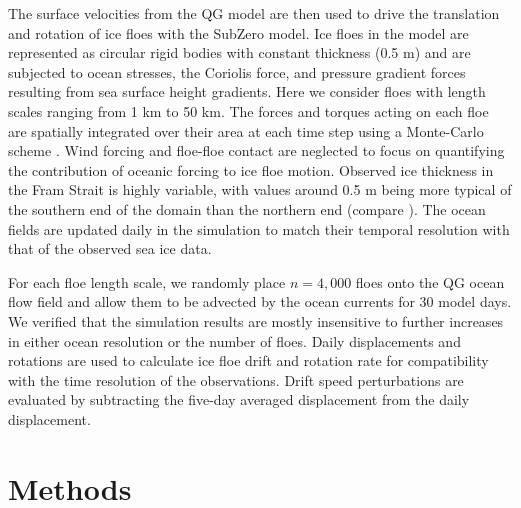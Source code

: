 \documentclass[aog]{igs}
\begin{document}
The surface velocities from the QG model are then used to drive the translation and rotation of ice floes with the SubZero model. Ice floes in the model are represented as circular rigid bodies with constant thickness (0.5 m) and are subjected to ocean stresses, the Coriolis force, and pressure gradient forces resulting from sea surface height gradients. Here we consider floes with length scales ranging from 1 km to 50 km. The forces and torques acting on each floe are spatially integrated over their area at each time step using a Monte-Carlo scheme \citep{Caflisch1998_monte}. Wind forcing and floe-floe contact are neglected to focus on quantifying the contribution of oceanic forcing to ice floe motion. Observed ice thickness in the Fram Strait is highly variable, with values around 0.5 m being more typical of the southern end of the domain than the northern end (compare \cite{spreen2020_ArcticSea, brunette2022_NewStatedependent}).
The ocean fields are updated daily in the simulation to match their temporal resolution with that of the observed sea ice data.


For each floe length scale, we randomly place $n=4,000$ floes onto the QG ocean flow field and allow them to be advected by the ocean currents for 30 model days. We verified that the simulation results are mostly insensitive to further increases in either ocean resolution or the number of floes.  Daily displacements and rotations are used to calculate ice floe drift and rotation rate for compatibility with the time resolution of the observations. 
Drift speed perturbations are evaluated by subtracting the five-day averaged displacement from the daily displacement.

\section{Methods}
\end{document}
